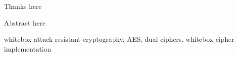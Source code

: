 \documentclass[11pt,oneside,final]{fithesis2}
\begin{document}
\newenvironment{atribut_description}
{\begin{description}
  \renewcommand{\makelabel}[1]{\texttt{\hspace{6pt}##1 $-$}}%
  \setlength{\itemsep}{1pt}
  \setlength{\parskip}{0pt}
  \setlength{\parsep}{0pt}}
{\end{description}}
\renewcommand{\tiny}{\fontsize{7.7}{9.7}\selectfont}

\FrontMatter
\ThesisTitlePage


\begin{ThesisDeclaration}
\DeclarationText
\AdvisorName
\end{ThesisDeclaration}

\begin{ThesisThanks}
[TODO] Thanks here
\end{ThesisThanks}

\begin{ThesisAbstract}
[TODO] Abstract here
\end{ThesisAbstract}

 
\begin{ThesisKeyWords}
whitebox attack resistant cryptography, AES, dual ciphers, whitebox cipher implementation
\end{ThesisKeyWords}
\MainMatter
\renewcommand{\contentsname}{Table of contents}
\end{document}
